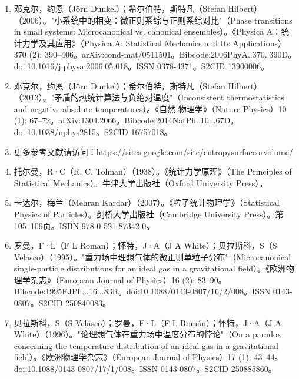 \begin{enumerate}
\item 邓克尔，约恩（Jörn Dunkel）；希尔伯特，斯特凡（Stefan Hilbert）（2006）。"小系统中的相变：微正则系综与正则系综对比"（Phase transitions in small systems: Microcanonical vs. canonical ensembles）。《Physica A：统计力学及其应用》（Physica A: Statistical Mechanics and Its Applications）370 (2): 390–406。arXiv:cond-mat/0511501。Bibcode:2006PhyA..370..390D。doi:10.1016/j.physa.2006.05.018。ISSN 0378-4371。S2CID 13900006。  
\item 邓克尔，约恩（Jörn Dunkel）；希尔伯特，斯特凡（Stefan Hilbert）（2013）。"矛盾的热统计算法与负绝对温度"（Inconsistent thermostatistics and negative absolute temperatures）。《自然-物理学》（Nature Physics）10 (1): 67–72。arXiv:1304.2066。Bibcode:2014NatPh..10...67D。doi:10.1038/nphys2815。S2CID 16757018。  
\item 更多参考文献请访问：https://sites.google.com/site/entropysurfaceorvolume/  
\item 托尔曼，R·C（R. C. Tolman）（1938）。《统计力学原理》（The Principles of Statistical Mechanics）。牛津大学出版社（Oxford University Press）。  
\item 卡达尔，梅兰（Mehran Kardar）（2007）。《粒子统计物理学》（Statistical Physics of Particles）。剑桥大学出版社（Cambridge University Press）。第105–109页。ISBN 978-0-521-87342-0。  
\item 罗曼，F·L（F L Roman）；怀特，J·A（J A White）；贝拉斯科，S（S Velasco）（1995）。"重力场中理想气体的微正则单粒子分布"（Microcanonical single-particle distributions for an ideal gas in a gravitational field）。《欧洲物理学杂志》（European Journal of Physics）16 (2): 83–90。Bibcode:1995EJPh...16...83R。doi:10.1088/0143-0807/16/2/008。ISSN 0143-0807。S2CID 250840083。  
\item 贝拉斯科，S（S Velasco）；罗曼，F·L（F L Román）；怀特，J·A（J A White）（1996）。"论理想气体在重力场中温度分布的悖论"（On a paradox concerning the temperature distribution of an ideal gas in a gravitational field）。《欧洲物理学杂志》（European Journal of Physics）17 (1): 43–44。doi:10.1088/0143-0807/17/1/008。ISSN 0143-0807。S2CID 250885860。  
\end{enumerate}


